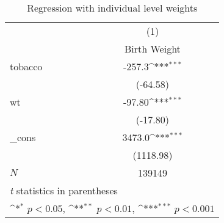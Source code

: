 \begin{table}[htbp]\centering
\def\sym#1{\ifmmode^{#1}\else\(^{#1}\)\fi}
\caption{Regression with individual level weights\label{f1}}
\begin{tabular}{l*{1}{c}}
\hline\hline
            &\multicolumn{1}{c}{(1)}\\
            &\multicolumn{1}{c}{Birth Weight}\\
\hline
tobacco     &      -257.3\sym{***}\\
            &    (-64.58)         \\
[1em]
wt          &      -97.80\sym{***}\\
            &    (-17.80)         \\
[1em]
\_cons      &      3473.0\sym{***}\\
            &   (1118.98)         \\
\hline
\(N\)       &      139149         \\
\hline\hline
\multicolumn{2}{l}{\footnotesize \textit{t} statistics in parentheses}\\
\multicolumn{2}{l}{\footnotesize \sym{*} \(p<0.05\), \sym{**} \(p<0.01\), \sym{***} \(p<0.001\)}\\
\end{tabular}
\end{table}
